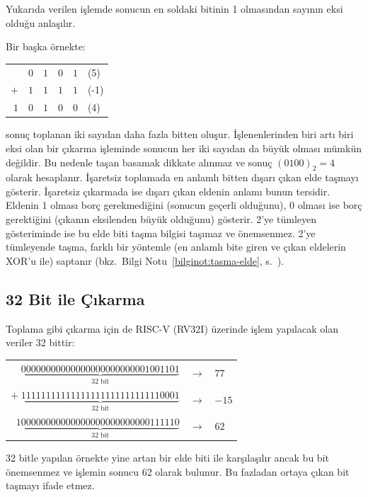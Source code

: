 Yukarıda verilen işlemde sonucun en soldaki bitinin 1 olmasından sayının eksi olduğu anlaşılır.

Bir başka örnekte:
\begin{center}
\begin{tabular}{r c c c c l}
  & $0$ & $1$ & $0$ & $1$ & (5)  \\
$+$ & $1$ & $1$ & $1$ & $1$ & (-1) \\
\hline
$1$ & $0$ & $1$ & $0$ & $0$ & (4) \\
\end{tabular}
\end{center}

sonuç toplanan iki sayıdan daha fazla bitten oluşur. İşlenenlerinden biri artı biri eksi olan bir çıkarma işleminde sonucun her iki sayıdan da büyük olması mümkün değildir. Bu nedenle taşan basamak dikkate alınmaz ve sonuç $(0100)_2 = 4$ olarak hesaplanır. İşaretsiz toplamada en anlamlı bitten dışarı çıkan elde taşmayı gösterir. İşaretsiz çıkarmada ise dışarı çıkan eldenin anlamı bunun tersidir. Eldenin 1 olması borç gerekmediğini (sonucun geçerli olduğunu), 0 olması ise borç gerektiğini (çıkanın eksilenden büyük olduğunu) gösterir. 2'ye tümleyen gösteriminde ise bu elde biti taşma bilgisi taşımaz ve önemsenmez. 2'ye tümleyende taşma, farklı bir yöntemle (en anlamlı bite giren ve çıkan eldelerin XOR'u ile) saptanır (bkz.\ Bilgi Notu~\ref{bilginot:tasma-elde}, s.~\pageref{bilginot:tasma-elde}).

\subsection{32 Bit ile Çıkarma}

Toplama gibi çıkarma için de RISC-V (RV32I) üzerinde işlem yapılacak olan veriler 32 bittir:

\begin{center}
\small
\begin{tabular}{r c l}
$\underbrace{00000000000000000000000001001101}_{32 \text{ bit}}$ & $\rightarrow$ & $77$ \\
$+ \; \underbrace{11111111111111111111111111110001}_{32 \text{ bit}}$ & $\rightarrow$ & $-15$ \\
\hline
$1\underbrace{00000000000000000000000000111110}_{32 \text{ bit}}$ & $\rightarrow$ & $62$ \\
\end{tabular}
\end{center}

32 bitle yapılan örnekte yine artan bir elde biti ile karşılaşılır ancak bu bit önemsenmez ve işlemin sonucu 62 olarak bulunur. Bu fazladan ortaya çıkan bit taşmayı ifade etmez.


